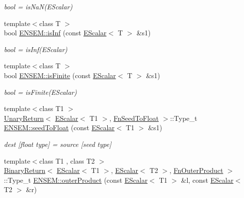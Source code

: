 \begin{DoxyCompactItemize}
\begin{DoxyCompactList}\small\item\em bool = is\+Na\+N(\+E\+Scalar) \end{DoxyCompactList}\item 
{\footnotesize template$<$class T $>$ }\\bool \mbox{\hyperlink{group__escalar_ga323a3743d3621a1c631ad3e52b85acba}{E\+N\+S\+E\+M\+::is\+Inf}} (const \mbox{\hyperlink{classENSEM_1_1EScalar}{E\+Scalar}}$<$ T $>$ \&s1)
\begin{DoxyCompactList}\small\item\em bool = is\+Inf(\+E\+Scalar) \end{DoxyCompactList}\item 
{\footnotesize template$<$class T $>$ }\\bool \mbox{\hyperlink{group__escalar_ga70fcd41007f852c6b90539df7b80af87}{E\+N\+S\+E\+M\+::is\+Finite}} (const \mbox{\hyperlink{classENSEM_1_1EScalar}{E\+Scalar}}$<$ T $>$ \&s1)
\begin{DoxyCompactList}\small\item\em bool = is\+Finite(\+E\+Scalar) \end{DoxyCompactList}\item 
{\footnotesize template$<$class T1 $>$ }\\\mbox{\hyperlink{structENSEM_1_1UnaryReturn}{Unary\+Return}}$<$ \mbox{\hyperlink{classENSEM_1_1EScalar}{E\+Scalar}}$<$ T1 $>$, \mbox{\hyperlink{structENSEM_1_1FnSeedToFloat}{Fn\+Seed\+To\+Float}} $>$\+::Type\+\_\+t \mbox{\hyperlink{group__escalar_ga7e479d7cf5ca7620a11e78b407b2e9c3}{E\+N\+S\+E\+M\+::seed\+To\+Float}} (const \mbox{\hyperlink{classENSEM_1_1EScalar}{E\+Scalar}}$<$ T1 $>$ \&s1)
\begin{DoxyCompactList}\small\item\em dest \mbox{[}float type\mbox{]} = source \mbox{[}seed type\mbox{]} \end{DoxyCompactList}\item 
{\footnotesize template$<$class T1 , class T2 $>$ }\\\mbox{\hyperlink{structENSEM_1_1BinaryReturn}{Binary\+Return}}$<$ \mbox{\hyperlink{classENSEM_1_1EScalar}{E\+Scalar}}$<$ T1 $>$, \mbox{\hyperlink{classENSEM_1_1EScalar}{E\+Scalar}}$<$ T2 $>$, \mbox{\hyperlink{structENSEM_1_1FnOuterProduct}{Fn\+Outer\+Product}} $>$\+::Type\+\_\+t \mbox{\hyperlink{group__escalar_gaf54c1015e882e21da36323ae571504dc}{E\+N\+S\+E\+M\+::outer\+Product}} (const \mbox{\hyperlink{classENSEM_1_1EScalar}{E\+Scalar}}$<$ T1 $>$ \&l, const \mbox{\hyperlink{classENSEM_1_1EScalar}{E\+Scalar}}$<$ T2 $>$ \&r)

\end{DoxyCompactItemize}
